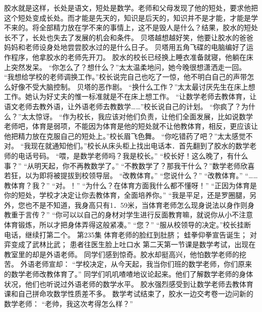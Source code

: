 \documentclass[a4paper,12pt,UTF8,twoside]{ctexbook}
\begin{document}
        胶水就是这样，长处是语文，短处是数学。老师和父母发现了他的短处，要求他把这个短处变成长处。而才能是先天的，知识是后天的，知识并不是才能，才能是学不来的。将全部精力放在学不来的事情上，这不是毁人是什么？结果，胶水的短处长不了，长处也失去了发展的机会和条件。  
        贝塔越想越好笑，他要让胶水的爸爸妈妈和老师设身处地尝尝胶水过的是什么日子。        
        贝塔用五角飞碟的电脑编好了运作程序，他拿胶水的老师先开刀。  
        胶水的校长已经换上睡衣准备就寝，他躺在床上突然发呆。  
        “你怎么了？想什么？”太太温柔地问，她今晚很想潇洒走一回。  
        “我想给学校的老师调换工作。”校长说完自己也吃了一惊，他不明白自己的声带怎么好像不受大脑控制。  
        贝塔的恶作剧。  
        “换什么工作？”太太最讨厌先生在床上想工作。她认为好丈夫的惟一标准就是不在床上想工作。  
        “让数学老师去教体育，让语文老师去教外语，让外语老师去教数学……”校长说自己的计划。  
        “你疯了？为什么？”太太惊讶。  
        “作为校长，我应该对他们负责，让他们全面发展，比如说数学老师吧，体育是弱项，不能因为体育是他的短处就不让他教体育，相反，更应该让他把精力放在克服自己的短处上。”校长眉飞色舞。  
        “你吃错药了吧？”太太感觉不对。  
        “我现在就通知他们。”校长从床头柜上找出电话本．首先翻到了胶水的数学老师的电话号码。  
        “喂，是数学老师吗？我是校长。”  
        “校长好！这么晚了，有什么事？”        
        “从明天起，你不再教数学了。”  
        “不教数学了？那我干什么？”数学老师欣喜若狂，以为即将被提拔到校领导层。  
        “改教体育。”  
        “您说什么？”  
        “改教体育。”  
        “……教体育？我？”  
        “对。！”  
        “为什么？在体育方面我什么都不懂呀！”  
        “正因为体育是你的短处，学校才决定让你去教体育，全面培养你。”  
        “我是平足，还是罗圈腿，另外，您也不是不知道，我身高只有1．59米，当体育老师怎么现身说法以身作则身教重于言传？”  
        “你可以以自己的身材对学生进行反面教育嘛，就说你从小不注意体育锻炼，所以才把身体弄得这般紧凑。”  
        “您？”  
        “服从校领导的决定。”校长挂断电话，继续打第二个。          第235集  
        体育老师的脸红到肚脐；  
        蛙拳仰拳宣告诞生；  
        对弈变成了武林比武；  
        患者往医生脸上吐口水    
        第二天第一节课是数学考试，出现在教室里的却是外语老师。  
        同学们感到惊奇。胶水却挺高兴，他怕数学老师的挖苦。  
        外语老师宣却：  
        “学校决定，从今天起，我当你们班的数学老师，你们原来的数学老师改教体育了。”  
        同学们叽叽喳喳地议论起来。他们了解数学老师的身体状况，他们也听说过外语老师的数学水平。  
        胶水强烈感受到让数学老师去教体育课和自己拼命攻数学性质差不多。        
        数学考试结束了，胶水一边交考卷一边问新的数学老师：  
        “老帅，我这次考得怎么样？”  
\end{document}

